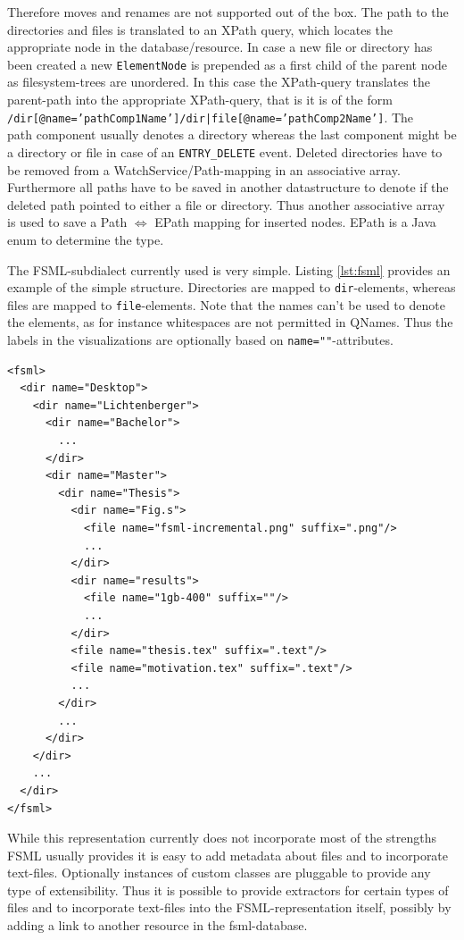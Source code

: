 Therefore moves and renames are not supported out of the box. The path to the directories and files is translated to an XPath query, which locates the appropriate node in the database/resource. In case a new file or directory has been created a new \texttt{ElementNode} is pre\-pen\-ded as a first child of the parent node as filesystem-trees are unordered. In this case the XPath-query translates the parent-path into the appropriate XPath-query, that is it is of the form \\\texttt{/dir[@name='pathComp1Name']/dir|file[@name='pathComp2Name']}. The \\path component usually denotes a directory whereas the last component might be a directory or file in case of an \texttt{ENTRY\_DELETE} event. Deleted directories have to be removed from a WatchService/Path-mapping in an associative array. Furthermore all paths have to be saved in another datastructure to denote if the deleted path pointed to either a file or directory. Thus another associative array is used to save a Path $\Leftrightarrow$ EPath mapping for inserted nodes. EPath is a Java enum to determine the type.

The FSML-subdialect currently used is very simple. Listing \ref{lst:fsml} provides an example of the simple structure. Directories are mapped to \texttt{dir}-elements, whereas files are mapped to \texttt{file}-elements. Note that the names can't be used to denote the elements, as for instance whitespaces are not permitted in QNames. Thus the labels in the visualizations are optionally based on \texttt{name=""}-attributes.

\begin{lstlisting}[caption=FSML structure]
<fsml>
  <dir name="Desktop">
    <dir name="Lichtenberger">
      <dir name="Bachelor">
        ...
      </dir>
      <dir name="Master">
        <dir name="Thesis">
          <dir name="Fig.s">
            <file name="fsml-incremental.png" suffix=".png"/>
            ...
          </dir>
          <dir name="results">
            <file name="1gb-400" suffix=""/>
            ...
          </dir>
          <file name="thesis.tex" suffix=".text"/>
          <file name="motivation.tex" suffix=".text"/>
          ...
        </dir>
        ...
      </dir>
    </dir>
    ...
  </dir>
</fsml>
\end{lstlisting}
\label{lst:fsml}

While this representation currently does not incorporate most of the strengths FSML usually provides it is easy to add metadata about files and to incorporate text-files. Optionally instances of custom classes are pluggable to provide any type of extensibility. Thus it is possible to provide extractors for certain types of files and to incorporate text-files into the FSML-representation itself, possibly by adding a link to another resource in the fsml-database.

